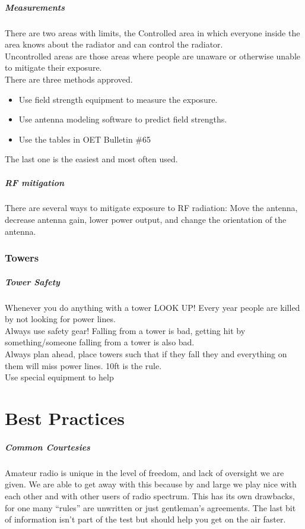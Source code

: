 \documentclass[10pt, handout]{beamer}
\begin{document}
\begin{frame}
\frametitle{Measurements}
There are two areas with limits, the Controlled area in which everyone inside the area knows about the radiator and can control the radiator.\\
Uncontrolled areas are those areas where people are unaware or otherwise unable to mitigate their exposure.\\
There are three methods approved.
\begin{itemize}
\item Use field strength equipment to measure the exposure.
\item Use antenna modeling software to predict field strengths.
\item Use the tables in OET Bulletin \#65
\end{itemize}
The last one is the easiest and most often used.
\end{frame}

\begin{frame}
\frametitle{RF mitigation}
There are several ways to mitigate exposure to RF radiation: Move the antenna, decrease antenna gain, lower power output, and change the orientation of the antenna.
\end{frame}

\section{Towers}

\begin{frame}
\frametitle{Tower Safety}
Whenever you do anything with a tower LOOK UP! Every year people are killed by not looking for power lines.\\
Always use safety gear! Falling from a tower is bad, getting hit by something/someone falling from a tower is also bad.\\
Always plan ahead, place towers such that if they fall they and everything on them will miss power lines. 10ft is the rule.\\
Use special equipment to help
\end{frame}

\part{Best Practices}

\begin{frame}
\frametitle{Common Courtesies}
Amateur radio is unique in the level of freedom, and lack of oversight we are given. We are able to get away with this because by and large we play nice with each other and with other users of radio spectrum. This has its own drawbacks, for one many ``rules'' are unwritten or just gentleman's agreements. The last bit of information isn't part of the test but should help you get on the air faster.
\end{frame}
\end{document}
